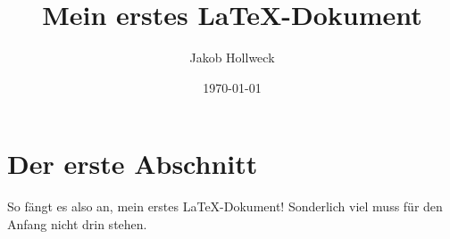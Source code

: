 \documentclass{scrartcl}
\title{Mein erstes \LaTeX-Dokument}
\author{Jakob Hollweck}
\date{\today}
\begin{document}
\maketitle

\section{Der erste Abschnitt}

So fängt es also an, mein erstes \LaTeX-Dokument!
Sonderlich viel muss für den Anfang nicht drin stehen.
\end{document}

